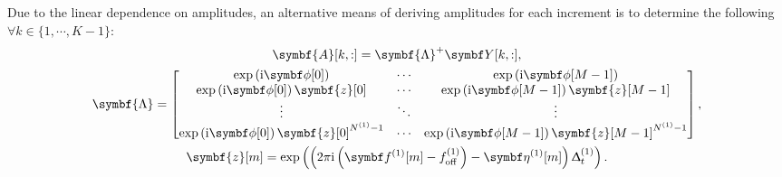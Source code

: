 \begin{remark}
    Due to the linear dependence on amplitudes, an alternative means of
    deriving amplitudes for each increment is to determine the following
    $\forall k \in \lbrace 1, \cdots, K-1\rbrace$:
    \begin{subequations}
        \begin{gather}
            \symbf{A}[k,:] = \symbf{\Lambda}^+ \bY[k,:], \\
            \symbf{\Lambda} =
            \begin{bmatrix}
                \exp\left(\iu \bdphi [0]\right) & \cdots & \exp\left(\iu \bdphi[M-1]\right) \\
                \exp\left(\iu \bdphi [0]\right) \symbf{z}[0] & \cdots & \exp\left(\iu \bdphi[M-1]\right) \symbf{z}[M-1]\\
                \vdots & \ddots & \vdots \\
                \exp\left(\iu \bdphi [0]\right) \symbf{z}[0]^{\None-1} & \cdots & \exp\left(\iu \bdphi[M-1]\right) \symbf{z}[M-1]^{\None-1}
            \end{bmatrix},\\
            \symbf{z}[m] = \exp\left(\left(2\pi \iu \left(\bdfone[m] - \foffone\right) - \bdetaone[m]\right)\Dtone \right).
        \end{gather}
    \end{subequations}
\end{remark}


